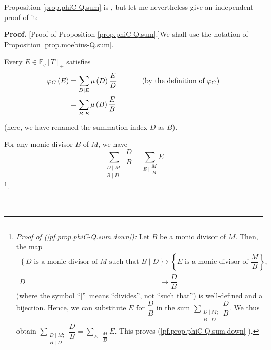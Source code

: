 \documentclass[numbers=enddot,12pt,final,onecolumn,notitlepage]{scrartcl}%
\theoremstyle{definition}
\newenvironment{proof}[1][Proof]{\noindent\textbf{#1.} }{\ \rule{0.5em}{0.5em}}
\let\sumnonlimits\sum
\renewcommand{\sum}{\sumnonlimits\limits}
\begin{document}
Proposition \ref{prop.phiC-Q.sum} is \cite[Theorem 4.5 (2)]{kc-carlitz}, but
let me nevertheless give an independent proof of it:

\begin{proof}
[Proof of Proposition \ref{prop.phiC-Q.sum}.]We shall use the notation of
Proposition \ref{prop.moebius-Q.sum}.

Every $E\in\mathbb{F}_{q}\left[  T\right]  _{+}$ satisfies%
\begin{align}
\varphi_{C}\left(  E\right)   &  =\sum\limits_{D\mid E}\mu\left(  D\right)
\dfrac{E}{D}\ \ \ \ \ \ \ \ \ \ \left(  \text{by the definition of }%
\varphi_{C}\right) \nonumber\\
&  =\sum_{B\mid E}\mu\left(  B\right)  \dfrac{E}{B}
\label{pf.prop.phiC-Q.sum.phiCE=}%
\end{align}
(here, we have renamed the summation index $D$ as $B$).

For any monic divisor $B$ of $M$, we have%
\begin{equation}
\sum_{\substack{D\mid M;\\B\mid D}}\dfrac{D}{B}=\sum_{E\mid\dfrac{M}{B}}E
\label{pf.prop.phiC-Q.sum.down}%
\end{equation}
\footnote{\textit{Proof of (\ref{pf.prop.phiC-Q.sum.down}):} Let $B$ be a
monic divisor of $M$. Then, the map%
\begin{align*}
\left\{  D\text{ is a monic divisor of }M\text{ such that }B\mid D\right\}
&  \rightarrow\left\{  E\text{ is a monic divisor of }\dfrac{M}{B}\right\}
,\\
D  &  \mapsto\dfrac{D}{B}%
\end{align*}
(where the symbol \textquotedblleft$\mid$\textquotedblright\ means
\textquotedblleft divides\textquotedblright, not \textquotedblleft such
that\textquotedblright) is well-defined and a bijection. Hence, we can
substitute $E$ for $\dfrac{D}{B}$ in the sum $\sum_{\substack{D\mid M;\\B\mid
D}}\dfrac{D}{B}$. We thus obtain $\sum_{\substack{D\mid M;\\B\mid D}}\dfrac
{D}{B}=\sum_{E\mid\dfrac{M}{B}}E$. This proves (\ref{pf.prop.phiC-Q.sum.down}%
).}.


\end{proof}
\end{document}
